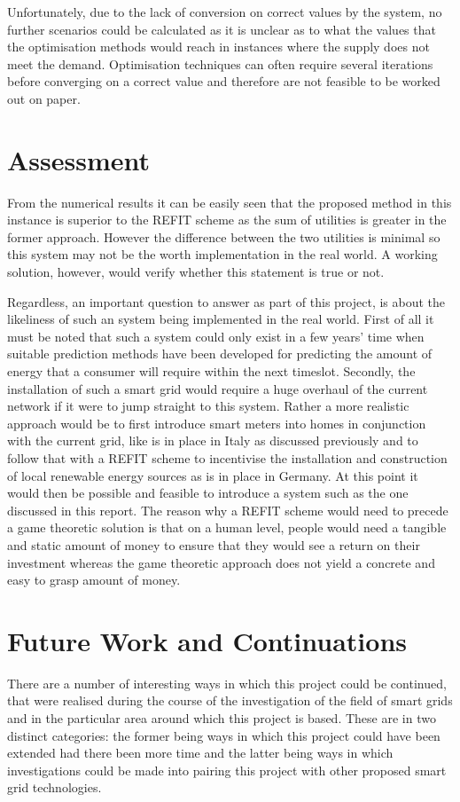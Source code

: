 \documentclass[a4paper, notitlepage]{report}
\begin{document}
Unfortunately, due to the lack of conversion on correct values by the system, no
further scenarios could be calculated as it is unclear as to what the values
that the optimisation methods would reach in instances where the supply does not
meet the demand. Optimisation techniques can often require several iterations
before converging on a correct value and therefore are not feasible to be worked
out on paper.
\chapter{Assessment}
\label{sec:org6549976}
From the numerical results it can be easily seen that the proposed method in
this instance is superior to the REFIT scheme as the sum of utilities is greater
in the former approach. However the difference between the two utilities is
minimal so this system may not be the worth implementation in the real world. A
working solution, however, would verify whether this statement is true or not.

Regardless, an important question to answer as part of this project, is about
the likeliness of such an system being implemented in the real world. First of
all it must be noted that such a system could only exist in a few years' time
when suitable prediction methods have been developed for predicting the amount
of energy that a consumer will require within the next timeslot. Secondly, the
installation of such a smart grid would require a huge overhaul of the current
network if it were to jump straight to this system. Rather a more realistic
approach would be to first introduce smart meters into homes in conjunction with
the current grid, like is in place in Italy as discussed previously and to
follow that with a REFIT scheme to incentivise the installation and construction
of local renewable energy sources as is in place in Germany. At this point it
would then be possible and feasible to introduce a system such as the one
discussed in this report. The reason why a REFIT scheme would need to precede a
game theoretic solution is that on a human level, people would need a tangible
and static amount of money to ensure that they would see a return on their
investment whereas the game theoretic approach does not yield a concrete and
easy to grasp amount of money.
\chapter{Future Work and Continuations}
\label{sec:org7815f82}
There are a number of interesting ways in which this project could be continued,
that were realised during the course of the investigation of the field of smart
grids and in the particular area around which this project is based. These are
in two distinct categories: the former being ways in which this project could
have been extended had there been more time and the latter being ways in which
investigations could be made into pairing this project with other proposed smart
grid technologies. 
\end{document}

